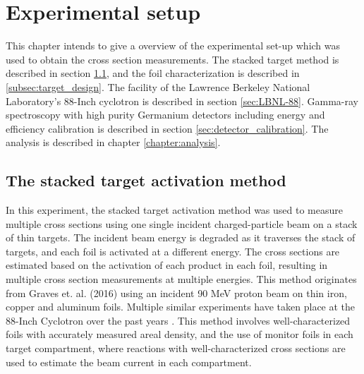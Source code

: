 \chapter{Experimental setup}
This chapter intends to give a overview of the experimental set-up which was used to obtain the cross section measurements. The stacked target method is described in section \ref{sec:stacked_target_method}, and the foil characterization is described in \ref{subsec:target_design}. The facility of the Lawrence Berkeley National Laboratory's 88-Inch cyclotron is described in section \ref{sec:LBNL-88}. Gamma-ray spectroscopy with high purity Germanium detectors including energy and efficiency calibration is described in section \ref{sec:detector_calibration}. The analysis is described in chapter \ref{chapter:analysis}. 


\section{The stacked target activation method} \label{sec:stacked_target_method}
In this experiment, the stacked target activation method was used to measure multiple cross sections using one single incident charged-particle beam on a stack of thin targets. The incident beam energy is degraded as it traverses the stack of targets, and each foil is activated at a different energy. The cross sections are estimated based on the activation of each product in each foil, resulting in multiple cross section measurements at multiple energies. This method originates from Graves et. al. (2016) \cite{Graves2016} using an incident 90 MeV proton beam on thin iron, copper and aluminum foils. Multiple similar experiments have taken place at the 88-Inch Cyclotron over the past years \cite{Voyles2019, Morrell2020, Voyles2018c}. This method involves well-characterized foils with accurately measured areal density, and the use of monitor foils in each target compartment, where reactions with well-characterized cross sections are used to estimate the beam current in each compartment.   \\ 


